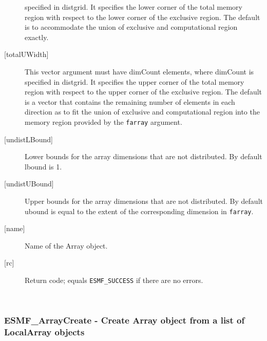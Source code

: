 \begin{description}
   specified in distgrid. It specifies the lower corner of the total memory 
   region with respect to the lower corner of the exclusive region. 
   The default is to accommodate the union of exclusive and computational 
   region exactly. 
   \item[{[totalUWidth]}] 
   This vector argument must have dimCount elements, where dimCount is 
   specified in distgrid. It specifies the upper corner of the total memory 
   region with respect to the upper corner of the exclusive region. 
   The default is a vector that contains the remaining number of elements 
   in each direction as to fit the union of exclusive and computational 
   region into the memory region provided by the {\tt farray} argument. 
   \item[{[undistLBound]}] 
   Lower bounds for the array dimensions that are not distributed. 
   By default lbound is 1. 
   \item[{[undistUBound]}] 
   Upper bounds for the array dimensions that are not distributed. 
   By default ubound is equal to the extent of the corresponding 
   dimension in {\tt farray}. 
   \item[{[name]}] 
   Name of the Array object. 
   \item[{[rc]}] 
   Return code; equals {\tt ESMF\_SUCCESS} if there are no errors. 
   \end{description} 
    
 
\mbox{}\hrulefill\ 
 
\subsubsection [ESMF\_ArrayCreate] {ESMF\_ArrayCreate - Create Array object from a list of LocalArray objects}


